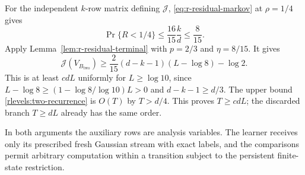For the independent \(k\)-row matrix defining \(\mathcal J\),
\eqref{eq:r-residual-markov} at \(\rho=1/4\) gives
\[
 \Pr\{R<1/4\}\le\frac{16}{15}\frac{k}{d}\le\frac8{15}.
\]
Apply Lemma~\ref{lem:r-residual-terminal} with \(p=2/3\) and
\(\eta=8/15\).  It gives
\begin{equation}\label{rlevels:two-endpoint}
 \mathcal J(V_{B_{\mathrm{two}}})
 \ge\frac2{15}(d-k-1)(L-\log8)-\log2.
\end{equation}
This is at least \(cdL\) uniformly for \(L\ge\log10\), since
\(L-\log8\ge(1-\log8/\log10)L>0\) and
\(d-k-1\ge d/3\).
The upper bound
\eqref{rlevels:two-recurrence} is \(O(T)\) by
\(T>d/4\).  This proves \(T\ge cdL\); the discarded branch
\(T\ge dL\) already has the same order.

In both arguments the auxiliary rows are analysis variables.  The
learner receives only its prescribed fresh Gaussian stream with exact
labels, and the comparisons permit arbitrary computation within a
transition subject to the persistent finite-state restriction.
